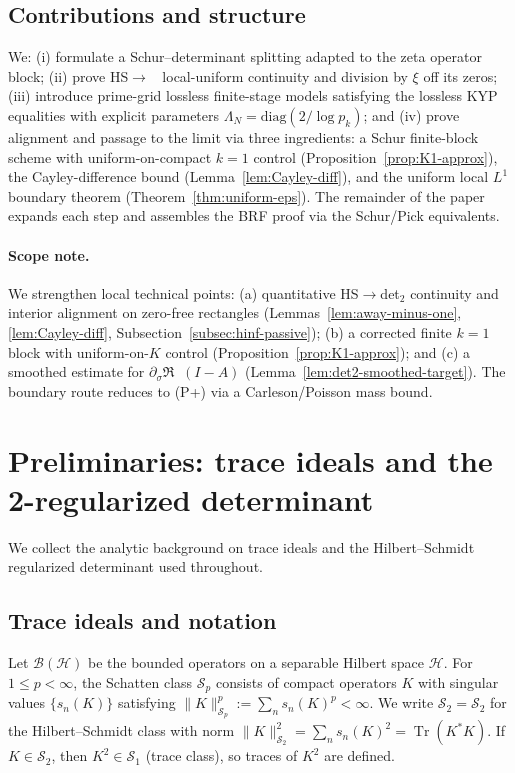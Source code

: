\documentclass[11pt]{article}
\theoremstyle{remark}
\newcommand{\HS}{\mathcal{S}_2}
\DeclareMathOperator{\Tr}{Tr}
\DeclareMathOperator{\dettwo}{det_2}
\begin{document}
\subsection*{Contributions and structure}
We: (i) formulate a Schur--determinant splitting adapted to the zeta operator block; (ii) prove HS\(\to\)\(\dettwo\) local-uniform continuity and division by \(\xi\) off its zeros; (iii) introduce prime-grid lossless finite-stage models satisfying the lossless KYP equalities with explicit parameters \(\Lambda_N=\mathrm{diag}(2/\log p_k)\); and (iv) prove alignment and passage to the limit via three ingredients: a Schur finite-block scheme with uniform-on-compact $k=1$ control (Proposition~\ref{prop:K1-approx}), the Cayley-difference bound (Lemma~\ref{lem:Cayley-diff}), and the uniform local \(L^1\) boundary theorem (Theorem~\ref{thm:uniform-eps}). The remainder of the paper expands each step and assembles the BRF proof via the Schur/Pick equivalents.
\paragraph{Scope note.} We strengthen local technical points: (a) quantitative HS$\to$det$_2$ continuity and interior alignment on zero-free rectangles (Lemmas~\ref{lem:away-minus-one}, \ref{lem:Cayley-diff}, Subsection~\ref{subsec:hinf-passive}); (b) a corrected finite $k{=}1$ block with uniform-on-$K$ control (Proposition~\ref{prop:K1-approx}); and (c) a smoothed estimate for $\partial_\sigma\Re\dettwo(I-A)$ (Lemma~\ref{lem:det2-smoothed-target}). The boundary route reduces to (P+) via a Carleson/Poisson mass bound.
\section{Preliminaries: trace ideals and the 2-regularized determinant}
We collect the analytic background on trace ideals and the Hilbert--Schmidt regularized determinant used throughout.
\subsection{Trace ideals and notation}
Let \(\mathcal{B}(\mathcal{H})\) be the bounded operators on a separable Hilbert space \(\mathcal{H}\). For \(1\le p<\infty\), the Schatten class \(\mathcal{S}_p\) consists of compact operators \(K\) with singular values \(\{s_n(K)\}\) satisfying \(\|K\|_{\mathcal{S}_p}^p:=\sum_n s_n(K)^p<\infty\). We write \(\HS=\mathcal{S}_2\) for the Hilbert--Schmidt class with norm \(\|K\|_{\HS}^2=\sum_n s_n(K)^2=\Tr(K^*K)\). If \(K\in\HS\), then \(K^2\in \mathcal{S}_1\) (trace class), so traces of \(K^2\) are defined.
\end{document}
